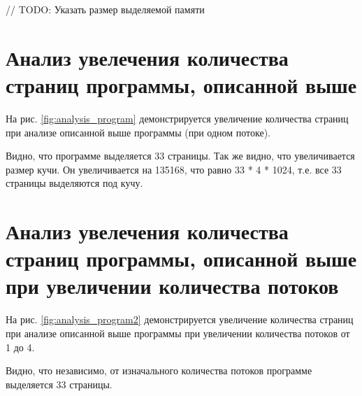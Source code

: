 \newpage

// TODO: Указать размер  выделяемой памяти

\section{Анализ увелечения количества страниц программы, описанной выше}

На рис. \ref{fig:analysis_program} демонстрируется увеличение количества страниц 
при анализе описанной выше программы (при одном потоке).

Видно, что программе выделяется 33 страницы. 
Так же видно, что увеличивается размер кучи. 
Он увеличивается на 135168, что равно 33 * 4 * 1024, т.е. все 33 страницы выделяются под кучу.

\begin{figure}[ht!]
\end{figure}

\newpage

\section{Анализ увелечения количества страниц программы, описанной выше при увеличении количества потоков}

На рис. \ref{fig:analysis_program2} демонстрируется увеличение количества страниц 
при анализе описанной выше программы при увеличении количества потоков от 1 до 4.

Видно, что независимо, от изначального количества потоков программе выделяется 33 страницы. 

